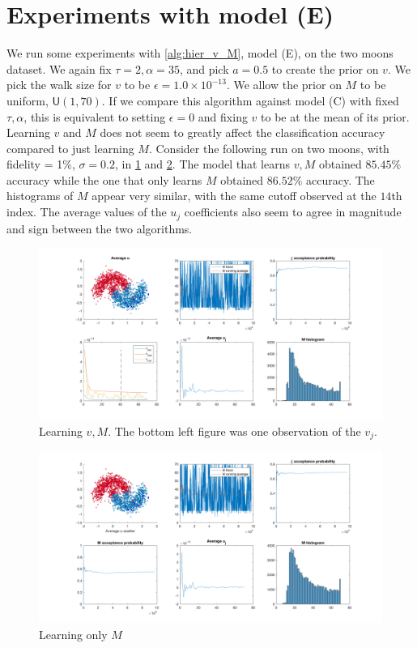 \documentclass{siamart1116}
\begin{document}
\section{Experiments with model (E)}
    We run some experiments with \cref{alg:hier_v_M}, model (E), on the two moons dataset. We again fix $\tau = 2, \alpha = 35$, and pick $a=0.5$ to create the prior on $v$. We pick the walk size for $v$ to be $\epsilon = 1.0\times 10^{-13}$. We allow the prior on $M$ to be uniform, $\mathsf{U}(1,70)$. If we compare this algorithm against model (C) with fixed $\tau, \alpha$, this is equivalent to setting $\epsilon = 0$ and fixing $v$ to be at the mean of its prior. Learning $v$ and $M$ does not seem to greatly affect the classification accuracy compared to just learning $M$. Consider the following run on two moons, with fidelity = 1\%, $\sigma = 0.2$, in \cref{fig:modelE_learn_v} and \cref{fig:modelE_fixed_v}. The model that learns $v, M$ obtained $85.45\%$ accuracy while the one that only learns $M$ obtained $86.52\%$ accuracy. The histograms of $M$ appear very similar, with the same cutoff observed at the $14$th index. The average values of the $u_j$ coefficients also seem to agree in magnitude and sign between the two algorithms.

    \begin{figure}
        \caption{\label{fig:modelE_learn_v}Learning $v, M$. The bottom left figure was one observation of the $v_j$.}
        \includegraphics[width=\linewidth]{learnv/v_uniform_prior/all.png}
    \end{figure}

    \begin{figure}
        \caption{\label{fig:modelE_fixed_v}Learning only $M$}
        \includegraphics[width=\linewidth]{learnv/v_fixed/all.png}
    \end{figure}
    
\end{document}
